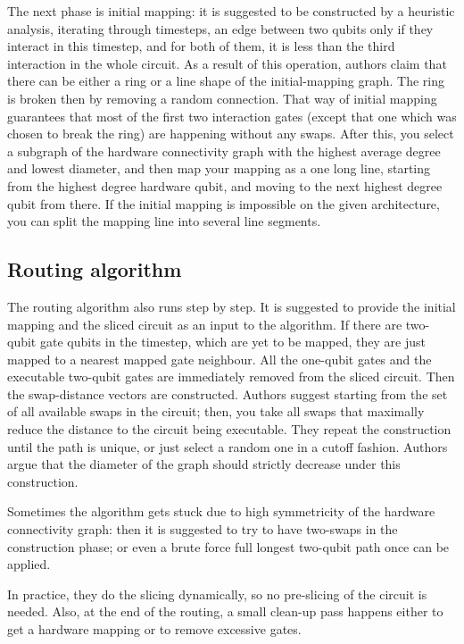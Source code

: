 The next phase is initial mapping: it is suggested to be constructed by a heuristic analysis, iterating through timesteps, an edge between two qubits only if they interact in this timestep, and for both of them, it is less than the third interaction in the whole circuit. As a result of this operation, authors claim that there can be either a ring or a line shape of the initial-mapping graph. The ring is broken then by removing a random connection. That way of initial mapping guarantees that most of the first two interaction gates (except that one which was chosen to break the ring) are happening without any swaps. After this, you select a subgraph of the hardware connectivity graph with the highest average degree and lowest diameter, and then map your mapping as a one long line, starting from the highest degree hardware qubit, and moving to the next highest degree qubit from there. If the initial mapping is impossible on the given architecture, you can split the mapping line into several line segments.

\subsection{Routing algorithm}

The routing algorithm also runs step by step. It is suggested to provide the initial mapping and the sliced circuit as an input to the algorithm. If there are two-qubit gate qubits in the timestep, which are yet to be mapped, they are just mapped to a nearest mapped gate neighbour. All the one-qubit gates and the executable two-qubit gates are immediately removed from the sliced circuit. Then the swap-distance vectors are constructed. Authors suggest starting from the set of all available swaps in the circuit; then, you take all swaps that maximally reduce the distance to the circuit being executable. They repeat the construction until the path is unique, or just select a random one in a cutoff fashion. Authors argue that the diameter of the graph should strictly decrease under this construction.

Sometimes the algorithm gets stuck due to high symmetricity of the hardware connectivity graph:  then it is suggested to try to have two-swaps in the construction phase; or even a brute force full longest two-qubit path once can be applied.

In practice, they do the slicing dynamically, so no pre-slicing of the circuit is needed. Also, at the end of the routing, a small clean-up pass happens either to get a hardware mapping or to remove excessive gates.  





